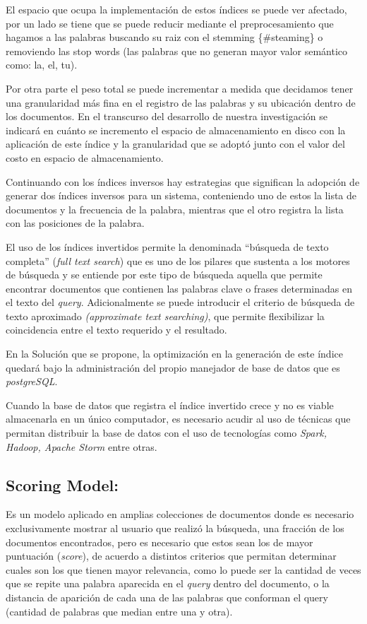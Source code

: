 \documentclass[
  10,
  openany]{book}
\begin{document}
El espacio que ocupa la implementación de estos índices se puede ver afectado, por un lado se tiene que se puede reducir mediante el preprocesamiento que hagamos a las palabras buscando su raiz con el stemming \{\#steaming\} o removiendo las stop words (las palabras que no generan mayor valor semántico como: la, el, tu).

Por otra parte el peso total se puede incrementar a medida que decidamos tener una granularidad más fina en el registro de las palabras y su ubicación dentro de los documentos. En el transcurso del desarrollo de nuestra investigación se indicará en cuánto se incremento el espacio de almacenamiento en disco con la aplicación de este índice y la granularidad que se adoptó junto con el valor del costo en espacio de almacenamiento.

Continuando con los índices inversos hay estrategias que significan la adopción de generar dos índices inversos para un sistema, conteniendo uno de estos la lista de documentos y la frecuencia de la palabra, mientras que el otro registra la lista con las posiciones de la palabra.

El uso de los índices invertidos permite la denominada ``búsqueda de texto completa'' (\emph{full text search}) que es uno de los pilares que sustenta a los motores de búsqueda y se entiende por este tipo de búsqueda aquella que permite encontrar documentos que contienen las palabras clave o frases determinadas en el texto del \emph{query}. Adicionalmente se puede introducir el criterio de búsqueda de texto aproximado \emph{(approximate text searching)}, que permite flexibilizar la coincidencia entre el texto requerido y el resultado.

En la Solución que se propone, la optimización en la generación de este índice quedará bajo la administración del propio manejador de base de datos que es \emph{postgreSQL}.

Cuando la base de datos que registra el índice invertido crece y no es viable almacenarla en un único computador, es necesario acudir al uso de técnicas que permitan distribuir la base de datos con el uso de tecnologías como \emph{Spark, Hadoop, Apache Storm} entre otras.

\hypertarget{rank}{%
\subsection{Scoring Model:}\label{rank}}

Es un modelo aplicado en amplias colecciones de documentos donde es necesario exclusivamente mostrar al usuario que realizó la búsqueda, una fracción de los documentos encontrados, pero es necesario que estos sean los de mayor puntuación (\emph{score}), de acuerdo a distintos criterios que permitan determinar cuales son los que tienen mayor relevancia, como lo puede ser la cantidad de veces que se repite una palabra aparecida en el \emph{query} dentro del documento, o la distancia de aparición de cada una de las palabras que conforman el query (cantidad de palabras que median entre una y otra).
\end{document}
